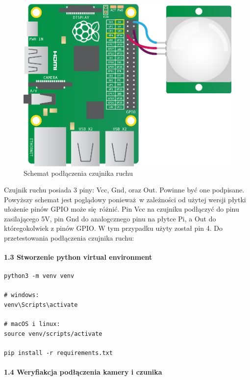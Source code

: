 \documentclass{article}
\begin{document}
\begin{figure}[H]
\centering
\includegraphics[width=12cm,height=\textheight,keepaspectratio]{images/pir_wiring.png}
\caption{Schemat podłączenia czujnika ruchu}
\end{figure}

Czujnik ruchu posiada 3 piny: Vcc, Gnd, oraz Out. Powinne być one
podpisane. Powyższy schemat jest poglądowy ponieważ~w zależności od
użytej wersji płytki ułożenie pinów GPIO może się~różnić. Pin Vcc na
czujniku podłączyć do pinu zasilającego 5V, pin Gnd do analogcznego pinu
na płytce Pi, a Out do któregokolwiek z pinów GPIO. W tym przypadku
użyty został pin 4. Do przetestowania podłączenia czujnika ruchu:

\paragraph{1.3 Stworzenie python virtual
environment}\label{stworzenie-python-virtual-environment}

\begin{verbatim}
python3 -m venv venv

# windows:
venv\Scripts\activate

# macOS i linux:
source venv/scripts/activate

pip install -r requirements.txt
\end{verbatim}

\paragraph{1.4 Weryfiakcja podłączenia kamery i
czunika}\label{weryfiakcja-podux142ux105czenia-kamery-i-czunika}
\end{document}
